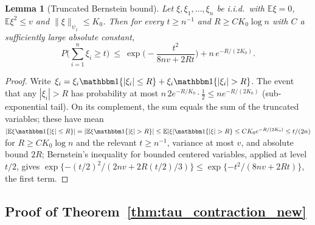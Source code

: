 \documentclass[11pt]{article}
\newtheorem{lemma}{Lemma}
\theoremstyle{definition}
\theoremstyle{plain}
\newcommand{\E}{\mathbb{E}}
\begin{document}
\begin{lemma}[Truncated Bernstein bound]
\label{lem:truncated_bernstein}
Let $\xi,\xi_1,\dots,\xi_n$ be i.i.d.\ with $\E\xi=0$, $\E\xi^2\le v$ and $\|\xi\|_{\psi_1}\le K_0$. Then for every $t\ge n^{-1}$ and $R\ge CK_0\log n$ with $C$ a sufficiently large absolute constant,
\[
P\Big(\sum_{i=1}^n\xi_i\ge t\Big)\ \le\ \exp\Big(-\frac{t^2}{8nv+2Rt}\Big)+n\,e^{-R/(2K_0)} .
\]
\end{lemma}

\begin{proof}
Write $\xi_i=\xi_i\mathbbm 1\{|\xi_i|\le R\}+\xi_i\mathbbm 1\{|\xi_i|>R\}$. The event that any $|\xi_i|>R$ has probability at most $n\,2e^{-R/K_0}\cdot\tfrac12\le ne^{-R/(2K_0)}$ (sub-exponential tail). On its complement, the sum equals the sum of the truncated variables; these have mean $|\E\xi\mathbbm 1\{|\xi|\le R\}|=|\E\xi\mathbbm 1\{|\xi|>R\}|\le\E|\xi|\mathbbm 1\{|\xi|>R\}\le CK_0e^{-R/(2K_0)}\le t/(2n)$ for $R\ge CK_0\log n$ and the relevant $t\ge n^{-1}$, variance at most $v$, and absolute bound $2R$; Bernstein's inequality for bounded centered variables, applied at level $t/2$, gives $\exp\{-(t/2)^2/(2nv+2R(t/2)/3)\}\le\exp\{-t^2/(8nv+2Rt)\}$, the first term.
\end{proof}

\subsection{Proof of Theorem~\ref{thm:tau_contraction_new}}
\end{document}
